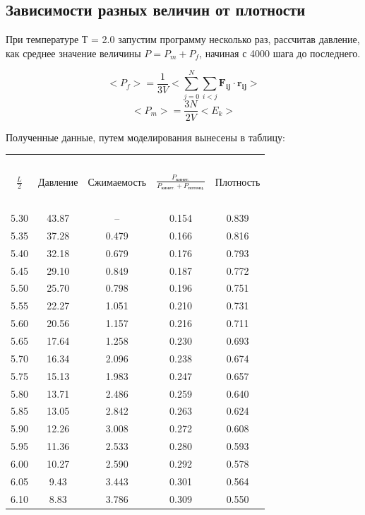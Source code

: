 \subsection{Зависимости разных величин от плотности}

При температуре Т = 2.0 запустим программу несколько раз, рассчитав давление, как среднее значение величины $P = P_m + P_f$, начиная с 4000 шага до последнего. 

$$<P_f> =\frac{1}{3V}< \sum\limits_{j = 0}^N\sum\limits_{i<j}\mathbf{F_{ij}}\cdot \mathbf{r_{ij}} > $$
$$<P_m> = \frac{3N}{2V}<E_k> $$

\newpage

Полученные данные, путем моделирования вынесены в таблицу:\\

\begin{center}
\begin{tabular}{|c|c|c|c|c|}
\hline
\ & \ & \ & \ & \ \\
$\frac{L}{2}$ &Давление & Сжимаемость &$ \frac{P_{кинет.}}{P_{кинет.} + P_{потенц.}} $& Плотность\\
 \ & \ & \ & \ \\
\hline
5.30 &43.87 & -- & 0.154 & 0.839 \\
\hline
5.35 &37.28 & 0.479&0.166  & 0.816 \\
\hline
5.40 &32.18 &0.679 &0.176  & 0.793 \\
\hline
5.45 &29.10 & 0.849&0.187  & 0.772\\
\hline
5.50 &25.70 &0.798 &0.196  & 0.751 \\
\hline
5.55 &22.27 &1.051 &0.210  & 0.731\\
\hline
5.60 &20.56 &1.157 &0.216  & 0.711\\
\hline
5.65 &17.64 &1.258 &0.230  & 0.693\\
\hline
5.70 &16.34 &2.096 &0.238  & 0.674\\
\hline
5.75 &15.13 &1.983 &0.247  & 0.657\\
\hline
5.80 &13.71 &2.486 &0.259  & 0.640\\
\hline
5.85 &13.05 &2.842 &0.263  & 0.624\\
\hline
5.90 &12.26 &3.008 &0.272  & 0.608\\
\hline
5.95 &11.36 &2.533 &0.280  & 0.593\\
\hline
6.00 &10.27 &2.590  & 0.292 & 0.578\\
\hline
6.05 &9.43 &3.443 &0.301  &0.564 \\
\hline
6.10 &8.83 &3.786  &0.309 & 0.550\\

\end{tabular}
\end{center}
